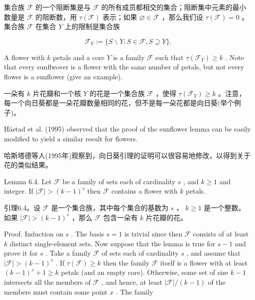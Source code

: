 \documentclass[10pt]{article}
\begin{document}
\begin{tcolorbox}\relax
集合族 \(\mathcal{F}\) 的一个阻断集是与 \(\mathcal{F}\) 的所有成员都相交的集合；阻断集中元素的最小数量是 \(\mathcal{F}\) 的阻断数，用 \(\tau \left( \mathcal{F}\right)\) 表示；如果 \(\varnothing  \in  \mathcal{F}\) ，那么我们设 \(\tau \left( \mathcal{F}\right)  = 0\) 。集合族 \(\mathcal{F}\) 在集合 \(Y\) 上的限制是集合族
\end{tcolorbox}

\[
{\mathcal{F}}_{Y} \mathrel{\text{ := }} \{ S \smallsetminus  Y : S \in  \mathcal{F},S \supseteq  Y\} .
\]

A flower with \(k\) petals and a core \(Y\) is a family \(\mathcal{F}\) such that \(\tau \left( {\mathcal{F}}_{Y}\right)  \geq  k\) . Note that every sunflwover is a flower with the same number of petals, but not every flower is a sunflower (give an example).

\begin{tcolorbox}\relax
一朵有 \(k\) 片花瓣和一个核 \(Y\) 的花是一个集合族 \(\mathcal{F}\) ，使得 \(\tau \left( {\mathcal{F}}_{Y}\right)  \geq  k\) 。注意，每一个向日葵都是一朵花瓣数量相同的花，但不是每一朵花都是向日葵(举个例子)。
\end{tcolorbox}

Håstad et al. (1995) observed that the proof of the sunflower lemma can be easily modified to yield a similar result for flowers.

\begin{tcolorbox}\relax
哈斯塔德等人(1995年)观察到，向日葵引理的证明可以很容易地修改，以得到关于花的类似结果。
\end{tcolorbox}

Lemma 6.4. Let \(\mathcal{F}\) be a family of sets each of cardinality \(s\) , and \(k \geq  1\) and integer. If \(\left| \mathcal{F}\right|  > {\left( k - 1\right) }^{s}\) then \(\mathcal{F}\) contains a flower with \(k\) petals.

\begin{tcolorbox}\relax
引理6.4。设 \(\mathcal{F}\) 是一个集合族，其中每个集合的基数为 \(s\) ， \(k \geq  1\) 是一个整数。如果 \(\left| \mathcal{F}\right|  > {\left( k - 1\right) }^{s}\) ，那么 \(\mathcal{F}\) 包含一朵有 \(k\) 片花瓣的花。
\end{tcolorbox}

Proof. Induction on \(s\) . The basis \(s = 1\) is trivial since then \(\mathcal{F}\) consists of at least \(k\) distinct single-element sets. Now suppose that the lemma is true for \(s - 1\) and prove it for \(s\) . Take a family \(\mathcal{F}\) of sets each of cardinality \(s\) , and assume that \(\left| \mathcal{F}\right|  > {\left( k - 1\right) }^{s}\) . If \(\tau \left( \mathcal{F}\right)  \geq  k\) then the family \(\mathcal{F}\) itself is a flower with at least \({\left( k - 1\right) }^{s} + 1 \geq  k\) petals (and an empty core). Otherwise, some set of size \(k - 1\) intersects all the members of \(\mathcal{F}\) , and hence, at least \(\left| \mathcal{F}\right| /\left( {k - 1}\right)\) of the members must contain some point \(x\) . The family
\end{document}
